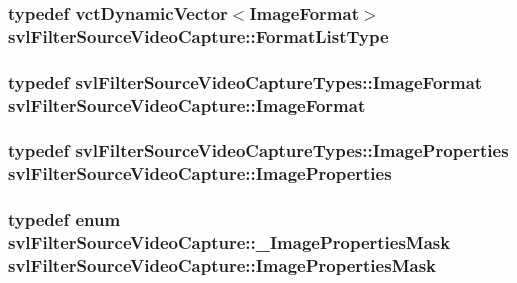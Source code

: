 \subsubsection[{Format\+List\+Type}]{\setlength{\rightskip}{0pt plus 5cm}typedef {\bf vct\+Dynamic\+Vector}$<${\bf Image\+Format}$>$ {\bf svl\+Filter\+Source\+Video\+Capture\+::\+Format\+List\+Type}}\label{classsvl_filter_source_video_capture_af6d31bdf8807755322cd7e5ef1f0d8d9}
\hypertarget{classsvl_filter_source_video_capture_a0944cc8abe4240701683128c28fa5349}{}
\subsubsection[{Image\+Format}]{\setlength{\rightskip}{0pt plus 5cm}typedef svl\+Filter\+Source\+Video\+Capture\+Types\+::\+Image\+Format {\bf svl\+Filter\+Source\+Video\+Capture\+::\+Image\+Format}}\label{classsvl_filter_source_video_capture_a0944cc8abe4240701683128c28fa5349}
\hypertarget{classsvl_filter_source_video_capture_ad5d8ccc6a284be386d49b60574937f4d}{}
\subsubsection[{Image\+Properties}]{\setlength{\rightskip}{0pt plus 5cm}typedef svl\+Filter\+Source\+Video\+Capture\+Types\+::\+Image\+Properties {\bf svl\+Filter\+Source\+Video\+Capture\+::\+Image\+Properties}}\label{classsvl_filter_source_video_capture_ad5d8ccc6a284be386d49b60574937f4d}
\hypertarget{classsvl_filter_source_video_capture_a52391ed8950c7d9b76ddb7d444a18ed1}{}
\subsubsection[{Image\+Properties\+Mask}]{\setlength{\rightskip}{0pt plus 5cm}typedef enum {\bf svl\+Filter\+Source\+Video\+Capture\+::\+\_\+\+Image\+Properties\+Mask}  {\bf svl\+Filter\+Source\+Video\+Capture\+::\+Image\+Properties\+Mask}}\label{classsvl_filter_source_video_capture_a52391ed8950c7d9b76ddb7d444a18ed1}
\hypertarget{classsvl_filter_source_video_capture_a374a69b1d506cf982ba5ce45d5f84776}{}
